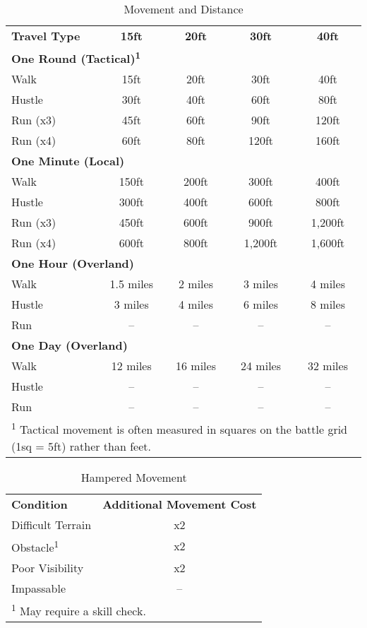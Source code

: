 \begin{table}[htb]
\mcinherit
\caption{Movement and Distance}
\centering
\begin{tabular}{l c c c c}
\textbf{Travel Type} & \textbf{15ft} & \textbf{20ft} & \textbf{30ft} & \textbf{40ft}\\
\multicolumn{5}{l}{\textbf{One Round (Tactical)\textsuperscript{1}}}\\
Walk & 15ft & 20ft & 30ft & 40ft\\
Hustle & 30ft & 40ft & 60ft & 80ft\\
Run (x3) & 45ft & 60ft & 90ft & 120ft\\
Run (x4) & 60ft & 80ft & 120ft & 160ft\\
\multicolumn{5}{l}{\textbf{One Minute (Local)}}\\
Walk & 150ft & 200ft & 300ft & 400ft\\
Hustle & 300ft & 400ft & 600ft & 800ft\\
Run (x3) & 450ft & 600ft & 900ft & 1,200ft\\
Run (x4) & 600ft & 800ft & 1,200ft & 1,600ft\\
\multicolumn{5}{l}{\textbf{One Hour (Overland)}}\\
Walk & 1.5 miles & 2 miles & 3 miles & 4 miles\\
Hustle & 3 miles & 4 miles & 6 miles & 8 miles\\
Run & -- & -- & -- & --\\
\multicolumn{5}{l}{\textbf{One Day (Overland)}}\\
Walk & 12 miles & 16 miles & 24 miles & 32 miles\\
Hustle & -- & -- & -- & --\\
Run & -- & -- & -- & --\\
\multicolumn{5}{p{8cm}}{\textsuperscript{1} Tactical movement is often measured in squares on the battle grid (1sq = 5ft) rather than feet.}\\
\end{tabular}
\end{table}

\begin{table}[htb]
\caption{Hampered Movement}
\centering
\begin{tabular}{l c}
\textbf{Condition} & \textbf{Additional Movement Cost}\\
Difficult Terrain & x2\\
Obstacle\textsuperscript{1} & x2\\
Poor Visibility & x2\\
Impassable & --\\
\multicolumn{2}{l}{\textsuperscript{1} May require a skill check.}\\
\end{tabular}
\end{table}


